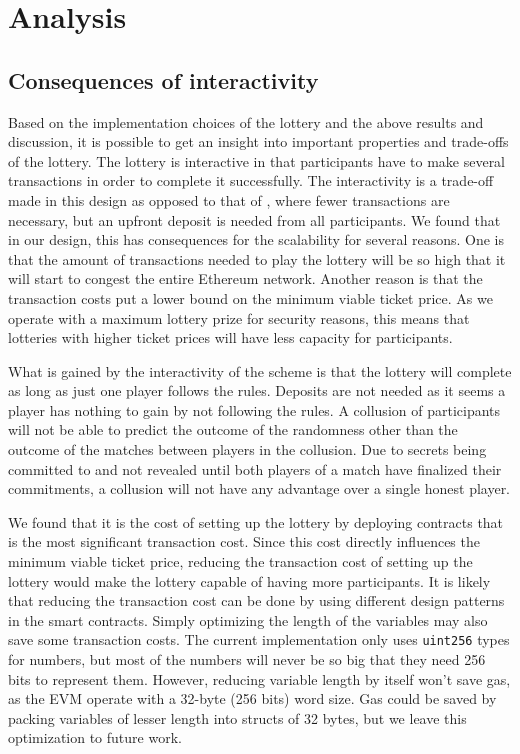 \section{Analysis}
\label{sec:analysis}

\subsection{Consequences of interactivity}

Based on the implementation choices of the lottery and the above results and discussion, it is possible to get an insight into important properties and trade-offs of the lottery. The lottery is interactive in that participants have to make several transactions in order to complete it successfully. The interactivity is a trade-off made in this design as opposed to that of \cite{andrychowicz_secure_2014,bentov_how_2014}, where fewer transactions are necessary, but an upfront deposit is needed from all participants. We found that in our design, this has consequences for the scalability for several reasons. One is that the amount of transactions needed to play the lottery will be so high that it will start to congest the entire Ethereum network. Another reason is that the transaction costs put a lower bound on the minimum viable ticket price. As we operate with a maximum lottery prize for security reasons, this means that lotteries with higher ticket prices will have less capacity for participants.

What is gained by the interactivity of the scheme is that the lottery will complete as long as just one player follows the rules. Deposits are not needed as it seems a player has nothing to gain by not following the rules. A collusion of participants will not be able to predict the outcome of the randomness other than the outcome of the matches between players in the collusion. Due to secrets being committed to and not revealed until both players of a match have finalized their commitments, a collusion will not have any advantage over a single honest player.

We found that it is the cost of setting up the lottery by deploying contracts that is the most significant transaction cost. Since this cost directly influences the minimum viable ticket price, reducing the transaction cost of setting up the lottery would make the lottery capable of having more participants. It is likely that reducing the transaction cost can be done by using different design patterns in the smart contracts. Simply optimizing the length of the variables may also save some transaction costs. The current implementation only uses \texttt{uint256} types for numbers, but most of the numbers will never be so big that they need 256 bits to represent them. However, reducing variable length by itself won't save gas, as the EVM operate with a 32-byte (256 bits) word size. Gas could be saved by packing variables of lesser length into structs of 32 bytes, but we leave this optimization to future work.


